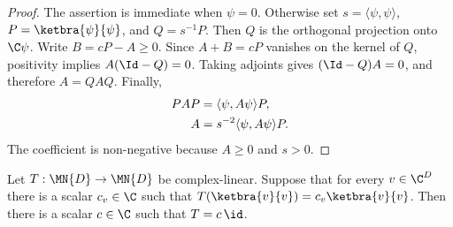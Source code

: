 \begin{proof}
    \leanok
    The assertion is immediate when $\psi=0$. Otherwise set
    $s=\langle\psi,\psi\rangle$, $P=\ketbra{\psi}{\psi}$, and $Q=s^{-1}P$.
    Then $Q$ is the orthogonal projection onto $\C\psi$. Write
    $B=cP-A\geq0$. Since $A+B=cP$ vanishes on the kernel of $Q$, positivity
    implies $A(\Id-Q)=0$.
    Taking adjoints gives $(\Id-Q)A=0$, and therefore $A=QAQ$. Finally,
    \begin{align}
        PAP
         & =\langle\psi,A\psi\rangle P, \notag \\
        A
         & =s^{-2}\langle\psi,A\psi\rangle P.
        \notag
    \end{align}
    The coefficient is non-negative because $A\geq0$ and $s>0$.
\end{proof}

\begin{theorem}
    \label{thm:rankone_ray_scalar_rigidity}
    \leanok
    Let $T:\MN{D}\to\MN{D}$ be complex-linear. Suppose that for every
    $v\in\C^D$ there is a scalar $c_v\in\C$ such that
    $T(\ketbra{v}{v})=c_v\ketbra{v}{v}$.
    Then there is a scalar $c\in\C$ such that $T=c\,\id$.
\end{theorem}

